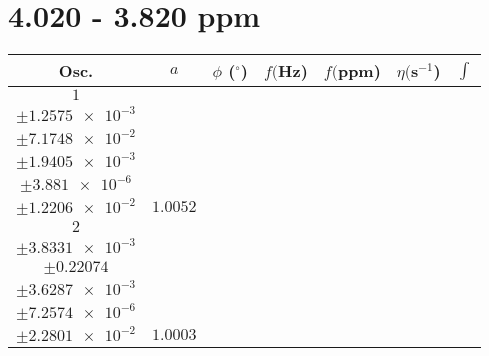 \documentclass[8pt]{article}
\begin{document}
\section*{4.020 - 3.820 ppm}
\begin{longtable}[l]{c c c c c c c}
\toprule
Osc. & $a$ & $\phi$ ($^{\circ}$) & $f ($Hz) & $f ($ppm) & $\eta ($s$^{-1}$) & $\int$\\
\midrule
$\num{1}$ & \begin{tabular}[c]{@{}c@{}}$\num{1.0035}$ \\ $\pm\num{1.2575e-3}$\end{tabular} & \begin{tabular}[c]{@{}c@{}}$\num{-1.1133e-3}$ \\ $\pm\num{7.1748e-2}$\end{tabular} & \begin{tabular}[c]{@{}c@{}}$\num{1.9386e+3}$ \\ $\pm\num{1.9405e-3}$\end{tabular} & \begin{tabular}[c]{@{}c@{}}$\num{3.8772}$ \\ $\pm\num{3.881e-6}$\end{tabular} & \begin{tabular}[c]{@{}c@{}}$\num{7.0167}$ \\ $\pm\num{1.2206e-2}$\end{tabular} & $\num{1.0052}$\\
$\num{2}$ & \begin{tabular}[c]{@{}c@{}}$\num{0.99852}$ \\ $\pm\num{3.8331e-3}$\end{tabular} & \begin{tabular}[c]{@{}c@{}}$\num{-2.1454e-2}$ \\ $\pm\num{0.22074}$\end{tabular} & \begin{tabular}[c]{@{}c@{}}$\num{1.9588e+3}$ \\ $\pm\num{3.6287e-3}$\end{tabular} & \begin{tabular}[c]{@{}c@{}}$\num{3.9176}$ \\ $\pm\num{7.2574e-6}$\end{tabular} & \begin{tabular}[c]{@{}c@{}}$\num{7.0111}$ \\ $\pm\num{2.2801e-2}$\end{tabular} & $\num{1.0003}$\\

\end{longtable}
\end{document}
